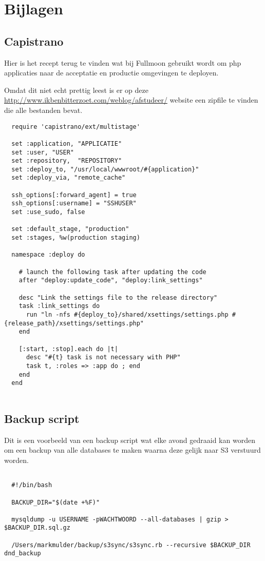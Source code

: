 \chapter{Bijlagen}

\section{Capistrano}

Hier is het recept terug te vinden wat bij Fullmoon gebruikt wordt om php applicaties naar de acceptatie en productie omgevingen te deployen.

Omdat dit niet echt prettig leest is er op deze \href{http://www.ikbenbitterzoet.com/weblog/afstudeer/}{http://www.ikbenbitterzoet.com/weblog/afstudeer/} website een zipfile te vinden die alle bestanden bevat.

\begin{verbatim}
  require 'capistrano/ext/multistage'

  set :application, "APPLICATIE"
  set :user, "USER"
  set :repository,  "REPOSITORY"
  set :deploy_to, "/usr/local/wwwroot/#{application}"
  set :deploy_via, "remote_cache"

  ssh_options[:forward_agent] = true
  ssh_options[:username] = "SSHUSER"
  set :use_sudo, false

  set :default_stage, "production"
  set :stages, %w(production staging)

  namespace :deploy do

    # launch the following task after updating the code
    after "deploy:update_code", "deploy:link_settings"

    desc "Link the settings file to the release directory"
    task :link_settings do
      run "ln -nfs #{deploy_to}/shared/xsettings/settings.php #{release_path}/xsettings/settings.php"
    end

    [:start, :stop].each do |t|
      desc "#{t} task is not necessary with PHP"
      task t, :roles => :app do ; end
    end
  end
  
\end{verbatim}

\section{Backup script}

Dit is een voorbeeld van een backup script wat elke avond gedraaid kan worden om een backup van alle databases te maken waarna deze gelijk naar S3 verstuurd worden.

\begin{verbatim}
  
  #!/bin/bash

  BACKUP_DIR="$(date +%F)"

  mysqldump -u USERNAME -pWACHTWOORD --all-databases | gzip > $BACKUP_DIR.sql.gz

  /Users/markmulder/backup/s3sync/s3sync.rb --recursive $BACKUP_DIR dnd_backup
  
\end{verbatim}